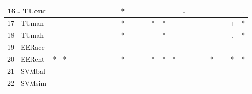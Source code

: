 \begin{table}[h]
\begin{center}
\begin{tabular}{lcc|cc|cc|cc|cc|cc|cc|cc|cc|cc|cc}
16 - TUeuc	&   &   &   &   &   &   &   &   &   & * &   &   &   & . &   & - &   &   &   &   &   & . \\ \hline
17 - TUman	&   &   &   &   &   &   &   &   &   & * &   &   & * & * &   &   & - &   &   &   & + & * \\
18 - TUmah	&   &   &   &   &   &   &   &   &   & * &   &   & + & * &   &   &   & - &   &   & . & * \\ \hline
19 - EERacc	&   &   &   &   &   &   &   &   &   &   &   &   &   &   &   &   &   &   & - &   &   &   \\
20 - EERent	& * & * &   &   &   &   &   &   &   & * & + &   & * & * & * &   &   &   & * & - & * & * \\ \hline
21 - SVMbal	&   &   &   &   &   &   &   &   &   &   &   &   &   &   &   &   &   &   &   &   & - &   \\
22 - SVMsim	&   &   &   &   &   &   &   &   &   &   &   &   &   &   &   &   &   &   &   &   &   & - \\ \hline\end{tabular}

\label{stratsfriedNB}
\end{center}
\end{table}